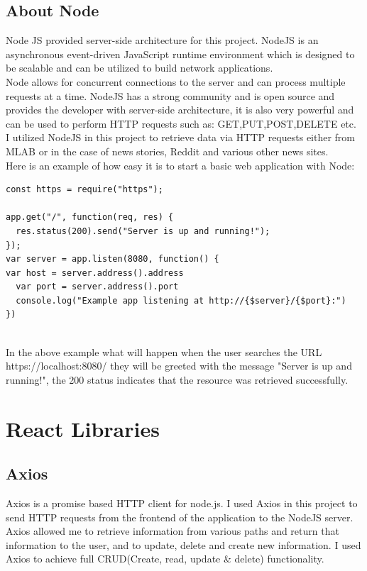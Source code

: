 \subsection{About Node}
Node JS provided server-side architecture for this project.  NodeJS is an asynchronous event-driven JavaScript runtime environment which is designed to be scalable and can be utilized to build network applications\cite{Node}.
\\
Node allows for concurrent connections to the server and can process multiple requests at a time.  NodeJS has a strong community and is open source and provides the developer with server-side architecture, it is also very powerful and can be used to perform HTTP requests such as: GET,PUT,POST,DELETE etc.
\\
 I utilized NodeJS in this project to retrieve data via HTTP requests either from MLAB or in the case of news stories, Reddit and various other news sites.
\\
Here is an example of how easy it is to start a basic web application with Node:
\\
\begin{verbatim}
const https = require("https");

app.get("/", function(req, res) {
  res.status(200).send("Server is up and running!");
});
var server = app.listen(8080, function() {
var host = server.address().address
  var port = server.address().port
  console.log("Example app listening at http://{$server}/{$port}:")
})
\end{verbatim}
\\
In the above example what will happen when the user searches the URL https://localhost:8080/ they will be greeted with the message "Server is up and running!", the 200 status indicates that the resource was retrieved successfully.
\section{React Libraries}
\subsection{Axios}
Axios is a promise based HTTP client for node.js\cite{Axios}.  I used Axios in this project to send HTTP requests from the frontend of the application to the NodeJS server.  Axios allowed me to retrieve information from various paths and return that information to the user, and to update, delete and create new information.  I used Axios to achieve full CRUD(Create, read, update \& delete) functionality.
